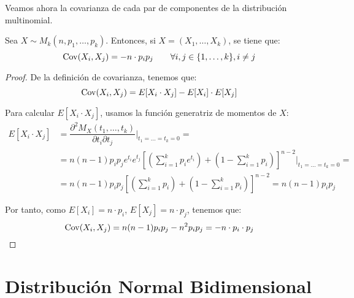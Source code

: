 Veamos ahora la covarianza de cada par de componentes de la distribución multinomial.
\begin{prop}
    Sea $X\sim M_k(n, p_1, \ldots, p_k)$. Entonces, si $X=(X_1, \ldots, X_k)$, se tiene que:
    \begin{equation*}
        \operatorname{Cov}(X_i, X_j)=-n\cdot p_i p_j \qquad \forall i,j\in \{1, \ldots, k\}, i\neq j
    \end{equation*}
\end{prop}
\begin{proof}
    De la definición de covarianza, tenemos que:
    \begin{equation*}
        \operatorname{Cov}(X_i, X_j)=E[X_i\cdot X_j]-E[X_i]\cdot E[X_j]
    \end{equation*}

    Para calcular $E[X_i\cdot X_j]$, usamos la función generatriz de momentos de $X$:
    \begin{align*}
        E[X_i\cdot X_j]&=\dfrac{\partial^2 M_X(t_1, \ldots, t_k)}{\partial t_i\partial t_j}\Bigg|_{t_1=\ldots=t_k=0}
        =\\&= n(n-1)p_ip_je^{t_i}e^{t_j}\left[\left(\sum_{i=1}^k p_i e^{t_i}\right)+\left(1-\sum_{i=1}^k p_i\right)\right]^{n-2}\Bigg|_{t_1=\ldots=t_k=0}
        =\\&= n(n-1)p_ip_j\left[\left(\sum_{i=1}^k p_i\right)+\left(1-\sum_{i=1}^k p_i\right)\right]^{n-2}
        = n(n-1)p_ip_j
    \end{align*}

    Por tanto, como $E[X_i]=n\cdot p_i$, $E[X_j]=n\cdot p_j$, tenemos que:
    \begin{equation*}
        \operatorname{Cov}(X_i, X_j)=n(n-1)p_ip_j-n^2p_ip_j=-n\cdot p_i\cdot p_j
    \end{equation*}
\end{proof}


\section{Distribución Normal Bidimensional}

